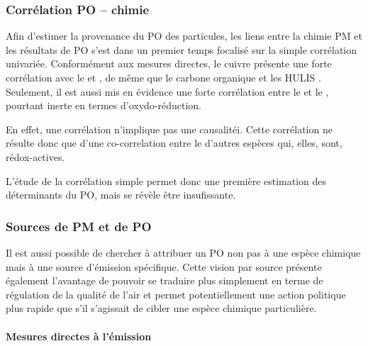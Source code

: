 \subsubsection{Corrélation PO -- chimie}%
\label{ssub:corrélation_po_chimie}

Afin d'estimer la provenance du PO des particules, les liens entre la chimie PM et les
résultats de PO s'est dans un premier temps focalisé sur la simple corrélation univariée.
Conformément aux mesures directes, le cuivre présente une
forte corrélation avec le \PODTT{} et \POAA, de même que le carbone organique et les HULIS
\parencite{vermaFractionating2015,batesReview2019}.
Seulement, il est aussi mis en évidence une forte corrélation entre le \PODTT{} et le
\NOt, pourtant inerte en termes d'oxydo-réduction.

En effet, une corrélation n'implique pas une causalitéi. Cette corrélation ne résulte donc
que d'une co-correlation entre le \NOt{} d'autres espèces qui, elles, sont, rédox-actives.

L'étude de la corrélation simple permet donc une première estimation des déterminants du
PO, mais se révèle être insufissante.


\subsubsection{Sources de PM et de PO}%
\label{ssub:sources_de_pm_et_de_po}

Il est aussi possible de chercher à attribuer un PO non pas à une espèce chimique mais à
une source d'émission spécifique.
Cette vision par source présente également l'avantage de pouvoir se traduire plus
simplement en terme de régulation de la qualité de l'air et permet
potentiellement une action politique plus rapide que s'il s'agissait de cibler une espèce
chimique particulière.

\paragraph{Mesures directes à l'émission}%
\label{par:mesures_directes_à_l_émission}

